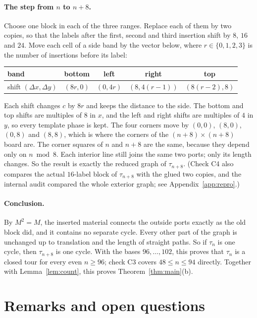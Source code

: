 \documentclass[11pt]{article}
\theoremstyle{definition}
\theoremstyle{remark}
\begin{document}
\paragraph{The step from $n$ to $n+8$.}
Choose one block in each of the three ranges.
Replace each of them by two copies, so that the labels after the first, second and third insertion shift by $8$, $16$ and $24$.
Move each cell of a side band by the vector below, where $r\in\{0,1,2,3\}$ is the number of insertions before its label:
\begin{center}
\begin{tabular}{lcccc}
\toprule
band & bottom & left & right & top\\\midrule
shift $(\Delta x,\Delta y)$ & $(8r,0)$ & $(0,4r)$ & $(8,4(r-1))$ & $(8(r-2),8)$\\\bottomrule
\end{tabular}
\end{center}
Each shift changes $c$ by $8r$ and keeps the distance to the side.
The bottom and top shifts are multiples of $8$ in $x$, and the left and right shifts are multiples of $4$ in $y$, so every template phase is kept.
The four corners move by $(0,0)$, $(8,0)$, $(0,8)$ and $(8,8)$, which is where the corners of the $(n+8)\times(n+8)$ board are.
The corner squares of $n$ and $n+8$ are the same, because they depend only on $n\bmod8$.
Each interior line still joins the same two ports; only its length changes.
So the result is exactly the reduced graph of $\tau_{n+8}$.
(Check C4 also compares the actual $16$-label block of $\tau_{n+8}$ with the glued two copies, and the internal audit compared the whole exterior graph; see Appendix~\ref{app:repro}.)

\paragraph{Conclusion.}
By $M^2=M$, the inserted material connects the outside ports exactly as the old block did, and it contains no separate cycle.
Every other part of the graph is unchanged up to translation and the length of straight paths.
So if $\tau_n$ is one cycle, then $\tau_{n+8}$ is one cycle.
With the bases $96,\dots,102$, this proves that $\tau_n$ is a closed tour for every even $n\ge96$; check C3 covers $48\le n\le 94$ directly.
Together with Lemma~\ref{lem:count}, this proves Theorem~\ref{thm:main}(b).

\section{Remarks and open questions}
\end{document}
